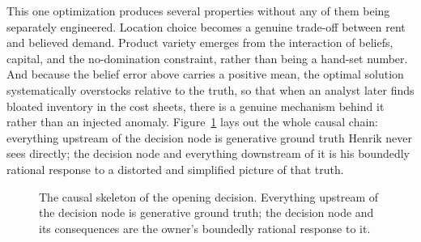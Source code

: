 \documentclass[12pt,a4paper]{article}
\begin{document}
This one optimization produces several properties without any of them
being separately engineered. Location choice becomes a genuine trade-off
between rent and believed demand. Product variety emerges from the
interaction of beliefs, capital, and the no-domination constraint,
rather than being a hand-set number. And because the belief error above
carries a positive mean, the optimal solution systematically overstocks
relative to the truth, so that when an analyst later finds bloated
inventory in the cost sheets, there is a genuine mechanism behind it
rather than an injected anomaly. Figure~\ref{fig:phase1graph} lays out
the whole causal chain: everything upstream of the decision node is
generative ground truth Henrik never sees directly; the decision node
and everything downstream of it is his boundedly rational response to a
distorted and simplified picture of that truth.

\begin{figure}[htbp]
\centering
{}
\caption{The causal skeleton of the opening decision. Everything upstream of the decision node is generative ground truth; the decision node and its consequences are the owner's boundedly rational response to it.}
\label{fig:phase1graph}
\end{figure}
\end{document}
